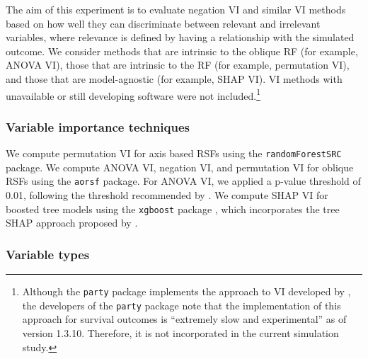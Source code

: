 \documentclass[twoside,11pt]{article}\usepackage[]{graphicx}\usepackage[]{xcolor}
\newcommand{\eg}{for example}
\begin{document}
The aim of this experiment is to evaluate negation VI and similar VI methods based on how well they can discriminate between relevant and irrelevant variables, where relevance is defined by having a relationship with the simulated outcome. We consider methods that are intrinsic to the oblique RF (\eg, ANOVA VI), those that are intrinsic to the RF (\eg, permutation VI), and those that are model-agnostic (\eg, SHAP VI). VI methods with unavailable or still developing software were not included.\footnote{Although the \texttt{party} package implements the approach to VI developed by \citet{strobl2007bias}, the developers of the \texttt{party} package note that the implementation of this approach for survival outcomes is ``extremely slow and experimental'' as of version 1.3.10. Therefore, it is not incorporated in the current simulation study.}

\subsubsection{Variable importance techniques}

We compute permutation VI for axis based RSFs using the \texttt{randomForestSRC} package. We compute ANOVA VI, negation VI, and permutation VI for oblique RSFs using the \texttt{aorsf} package. For ANOVA VI, we applied a p-value threshold of 0.01, following the threshold recommended by \citet{menze2011oblique}. We compute SHAP VI for boosted tree models using the \texttt{xgboost} package \citep{xgboost}, which incorporates the tree SHAP approach proposed by \citet{lundberg2018consistent}.


\subsubsection{Variable types}
\end{document}
